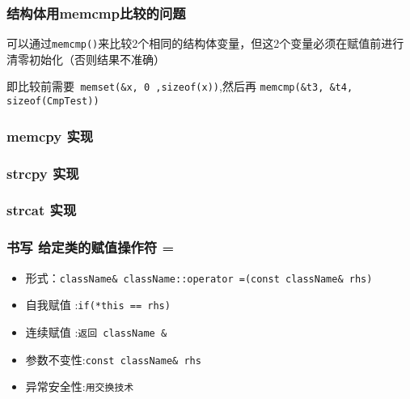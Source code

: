 \documentclass[UTF8,a4paper,8pt]{ctexart}
\begin{document}
		\subsubsection{结构体用memcmp比较的问题}
				可以通过\verb|memcmp()|来比较2个相同的结构体变量，但这2个变量必须在赋值前进行清零初始化（否则结果不准确）
				
				即比较前需要\verb| memset(&x, 0 ,sizeof(x))|,然后再 \verb|memcmp(&t3, &t4, sizeof(CmpTest))|
				
		\subsubsection{memcpy 实现}
				
		\subsubsection{strcpy 实现}
				
		\subsubsection{strcat 实现}
		
		\subsubsection{书写 给定类的赋值操作符 = }
			\begin{itemize}[itemindent = 1em]
				\item 形式：\verb|className& className::operator =(const className& rhs)|
				\item 自我赋值	:\verb|if(*this == rhs)|
				\item 连续赋值	:\verb|返回 className &|
				\item 参数不变性:\verb|const className& rhs|
				\item 异常安全性:\verb|用交换技术|
			\end{itemize}
			
\end{document}
